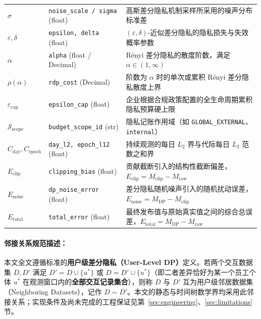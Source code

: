 \begin{table}[htbp]
\begin{tabularx}{\textwidth}{llX}
$\sigma$ & \texttt{noise\_scale / sigma} (float) & 高斯差分隐私机制采样所采用的噪声分布标准差 \\
$\varepsilon, \delta$ & \texttt{epsilon, delta} (float) & $(\varepsilon, \delta)$-近似差分隐私的隐私损失与失效概率参数 \\
$\alpha$ & \texttt{alpha} (float / Decimal) & Rényi 差分隐私的散度阶数，满足 $\alpha \in (1, \infty)$ \\
$\rho(\alpha)$ & \texttt{rdp\_cost} (Decimal) & 阶数为 $\alpha$ 时的单次或累积 Rényi 差分隐私散度上界 \\
$\varepsilon_{\text{cap}}$ & \texttt{epsilon\_cap} (float) & 企业根据合规政策配置的全生命周期累积隐私预算硬上限 \\
$\mathcal{S}_{\text{scope}}$ & \texttt{budget\_scope\_id} (str) & 隐私记账作用域（如 \texttt{GLOBAL\_EXTERNAL}、\texttt{internal}） \\
$C_{\text{day}}, C_{\text{epoch}}$ & \texttt{day\_l2, epoch\_l12} (float) & 持续观测的每日 $L_2$ 界与代际每日 $L_2$ 范数之和界 \\
$E_{\text{clip}}$ & \texttt{clipping\_bias} (float) & 贡献截断引入的结构性截断偏差，$E_{\text{clip}} = M_{\text{clip}} - M_{\text{raw}}$ \\
$E_{\text{noise}}$ & \texttt{dp\_noise\_error} (float) & 差分隐私随机噪声引入的随机扰动误差，$E_{\text{noise}} = M_{\text{DP}} - M_{\text{clip}}$ \\
$E_{\text{total}}$ & \texttt{total\_error} (float) & 最终发布值与原始真实值之间的综合总误差，$E_{\text{total}} = M_{\text{DP}} - M_{\text{raw}}$ \\
\bottomrule
\end{tabularx}
\end{table}

\paragraph{邻接关系规范描述：}
本文全文遵循标准的\textbf{用户级差分隐私（User-Level DP）}定义。若两个交互数据集 $D, D'$ 满足 $D' = D \cup \{u^*\}$ 或 $D = D' \cup \{u^*\}$（即二者差异恰好为某一个员工个体 $u^*$ 在观测窗口内的\textbf{全部交互记录集合}），则称 $D$ 与 $D'$ 互为用户级邻居数据集（Neighboring Datasets），记作 $D \sim D'$。本文的静态与时间树数学界均采用此邻接关系；实现条件及尚未完成的工程保证见第~\ref{sec:engineering}、\ref{sec:limitations} 节。

